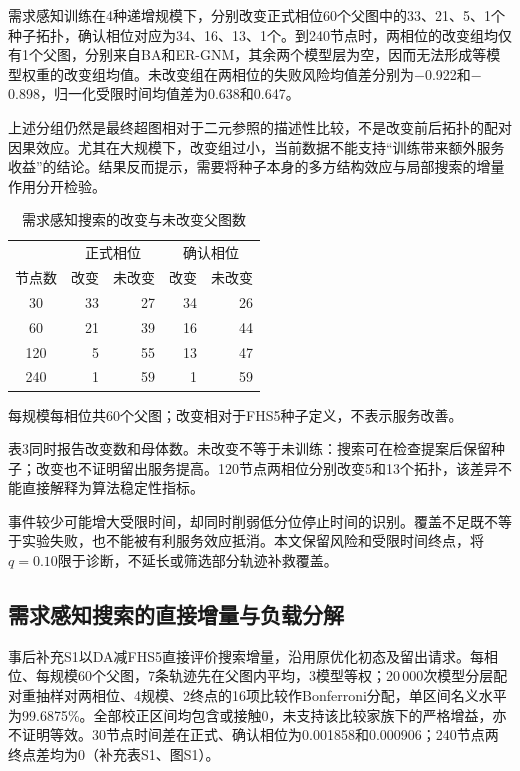 \documentclass[UTF8,a4paper,twocolumn,fontset=none,zihao=5]{ctexart}
\begin{document}
需求感知训练在4种递增规模下，分别改变正式相位60个父图中的33、21、5、1个种子拓扑，确认相位对应为34、16、13、1个。到240节点时，两相位的改变组均仅有1个父图，分别来自BA和ER-GNM，其余两个模型层为空，因而无法形成等模型权重的改变组均值。未改变组在两相位的失败风险均值差分别为$-$0.922和$-$0.898，归一化受限时间均值差为0.638和0.647。


上述分组仍然是最终超图相对于二元参照的描述性比较，不是改变前后拓扑的配对因果效应。尤其在大规模下，改变组过小，当前数据不能支持“训练带来额外服务收益”的结论。结果反而提示，需要将种子本身的多方结构效应与局部搜索的增量作用分开检验。


\begin{table}[t]\centering
\caption{需求感知搜索的改变与未改变父图数}\label{tab:3}
\small\begin{tabular*}{\columnwidth}{@{\extracolsep{\fill}}crrrr}\toprule
&\multicolumn{2}{c}{正式相位}&\multicolumn{2}{c}{确认相位}\\
节点数&改变&未改变&改变&未改变\\\midrule
30 & 33 & 27 & 34 & 26\\
60 & 21 & 39 & 16 & 44\\
120 & 5 & 55 & 13 & 47\\
240 & 1 & 59 & 1 & 59\\
\bottomrule\end{tabular*}
\par\smallskip\footnotesize 每规模每相位共60个父图；改变相对于FHS5种子定义，不表示服务改善。
\end{table}

表3同时报告改变数和母体数。未改变不等于未训练：搜索可在检查提案后保留种子；改变也不证明留出服务提高。120节点两相位分别改变5和13个拓扑，该差异不能直接解释为算法稳定性指标。


事件较少可能增大受限时间，却同时削弱低分位停止时间的识别。覆盖不足既不等于实验失败，也不能被有利服务效应抵消。本文保留风险和受限时间终点，将$q=0.10$限于诊断，不延长或筛选部分轨迹补救覆盖。


\subsection{需求感知搜索的直接增量与负载分解}

事后补充S1以DA减FHS5直接评价搜索增量，沿用原优化初态及留出请求。每相位、每规模60个父图，7条轨迹先在父图内平均，3模型等权；20\,000次模型分层配对重抽样对两相位、4规模、2终点的16项比较作Bonferroni分配，单区间名义水平为99.6875\%。全部校正区间均包含或接触0，未支持该比较家族下的严格增益，亦不证明等效。30节点时间差在正式、确认相位为0.001858和0.000906；240节点两终点差均为0（补充表S1、图S1）。
\end{document}
